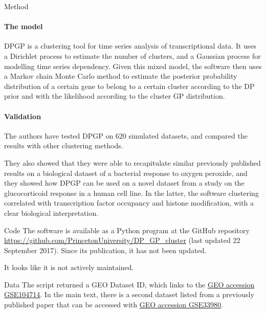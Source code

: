 \documentclass[10pt,a4paper]{article}
\newlength{\templength}
\newenvironment{ann_section}[1]
{\settowidth{\templength}{#1}%
\noindent\textbf{#1}
\hspace{1em}\begin{minipage}[t]{\dimexpr \linewidth-\the\templength-2em}}
{\end{minipage}\par\bigskip}
\begin{document}
\begin{ann_section}{Method}
\paragraph{The model} DPGP is a clustering tool for time series analysis of transcriptional data. It uses a Dirichlet process to estimate the number of clusters, and a Gaussian process for modelling time series dependency. Given this mixed model, the software then uses a Markov chain Monte Carlo method to estimate the posterior probability distribution of a certain gene to belong to a certain cluster according to the DP prior and with the likelihood according to the cluster GP distribution. 
\paragraph{Validation} The authors have tested DPGP on 620 simulated datasets, and compared the results with other clustering methods.

They also showed that they were able to recapitulate similar previously published results on a biological dataset of a bacterial response to oxygen peroxide, and they showed how DPGP can be used on a novel dataset from a study on the glucocorticoid response in a human cell line. In the latter, the software clustering correlated with transcription factor occupancy and histone modification, with a clear biological interpretation.
\end{ann_section}

\begin{ann_section}{Code}
The software is available as a Python program at the GitHub repository \url{https://github.com/PrincetonUniversity/DP_GP_cluster} (last updated 22 September 2017). Since its publication, it has not been updated.

It looks like it is not actively maintained.
\end{ann_section}

\begin{ann_section}{Data}
The script returned a GEO Dataset ID, which links to the \href{https://www.ncbi.nlm.nih.gov/geo/query/acc.cgi?acc=GSE104714}{GEO accession GSE104714}. In the main text, there is a second dataset listed from a previously published paper that can be accessed with \href{https://www.ncbi.nlm.nih.gov/geo/query/acc.cgi?acc=GSE33980}{GEO accession GSE33980}.
\end{ann_section}
\end{document}
